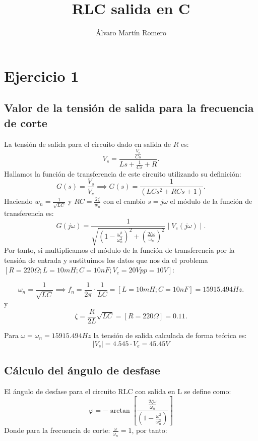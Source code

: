 \documentclass[11pt,letterpaper]{article}
\title{RLC salida en C}
\author{Álvaro Martín Romero}
\begin{document}
\maketitle
\tableofcontents
\section{Ejercicio 1}%
\label{sec:Muestra del circuito}
\subsection{Valor de la tensión de salida para la frecuencia de corte}
La tensión de salida para el circuito dado en salida de $R$ es:
\[
V_s=\frac{\frac{V_e}{Cs}}{Ls+\frac{1}{Cs}+R}
.\] 
Hallamos la función de transferencia de este circuito utilizando su definición:
\[
    G\left( s \right) =\frac{V_s}{V_e} \implies G\left( s \right) =\frac{1}{\left( LCs^2+ RCs + 1 \right) }
.\] 
Haciendo $w_n=\frac{1}{\sqrt{LC} }$ y $RC=\frac{2\zeta}{w_n}$ con el cambio $s=j\omega$ el módulo de la función de transferencia es:
 \[
     G\left( j\omega \right) =\frac{1}{\sqrt{\left( 1-\frac{\omega^2}{\omega_n^2} \right)^2+ \left( \frac{2\zeta \omega }{\omega_n} \right)^2  } } \mid V_e\left( j\omega \right)  \mid   
.\] 
Por tanto, si multiplicamos el módulo de la función de transferencia por la tensión de entrada y sustituimos los datos que nos da el problema $[R=220 \Omega ; L=10 mH; C=10nF; V_e =20Vpp=10 V]$:

\[
	\omega_{n}=\frac{1}{\sqrt{LC} }\implies f_n=\frac{1}{2\pi}\cdot \frac{1}{LC}=[L=10 mH; C= 10 nF]=15915.494 Hz 
.\] 
y 
 \[
	 \zeta=\frac{R}{2L}\sqrt{LC} =[R= 220 \Omega] =0.11
.\] 

Para $\omega=\omega_n= 15915.494Hz$ la tensión de salida calculada de forma teórica es:
\begin{equation}
	\boxed{ \mid V_s \mid = 4.545 \cdot V_e= 45.45 V}
\end{equation}

\subsection{Cálculo del ángulo de desfase}
El ángulo de desfase para el circuito RLC con salida en L se define como:
\begin{equation}
    \varphi= - \arctan\left[ \frac{\frac{2\zeta \omega}{\omega_n}}{\left( 1-\frac{\omega^2}{\omega_n^2} \right) } \right] 
    \label{desfase}
\end{equation}
Donde para la frecuencia de corte: $\frac{\omega}{\omega_n}=1$, por tanto:
\end{document}
